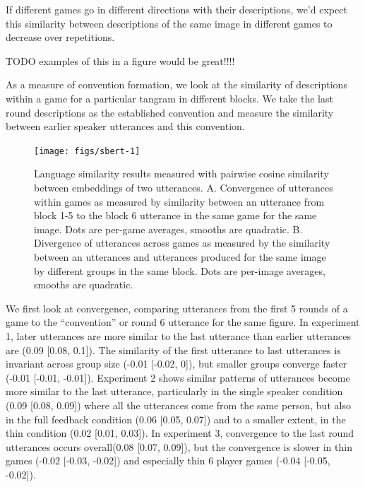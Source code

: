 \documentclass[
  english,
  a4paper,
]{article}
\begin{document}
If different games go in different directions with their descriptions, we'd expect this similarity between descriptions of the same image in different games to decrease over repetitions.

TODO examples of this in a figure would be great!!!!

As a measure of convention formation, we look at the similarity of descriptions within a game for a particular tangram in different blocks. We take the last round descriptions as the established convention and measure the similarity between earlier speaker utterances and this convention.

\begin{figure}[t!]

{\centering \texttt{[image: figs/sbert-1]} 

}

\caption{Language similarity results measured with pairwise cosine similarity between embeddings of two utterances. A. Convergence of utterances within games as measured by similarity between an utterance from block 1-5 to the block 6 utterance in the same game for the same image. Dots are per-game averages, smooths are quadratic. B. Divergence of utterances across games as measured by the similarity between an utterances and utterances produced for the same image by different groups in the same block. Dots are per-image averages, smooths are quadratic.}\label{fig:sbert}
\end{figure}

We first look at convergence, comparing utterances from the first 5 rounds of a game to the ``convention'' or round 6 utterance for the same figure. In experiment 1, later utterances are more similar to the last utterance than earlier utterances are (0.09 {[}0.08, 0.1{]}). The similarity of the first utterance to last utterances is invariant across group size (-0.01 {[}-0.02, 0{]}), but smaller groups converge faster (-0.01 {[}-0.01, -0.01{]}). Experiment 2 shows similar patterns of utterances become more similar to the last utterance, particularly in the single speaker condition (0.09 {[}0.08, 0.09{]}) where all the utterances come from the same person, but also in the full feedback condition (0.06 {[}0.05, 0.07{]}) and to a smaller extent, in the thin condition (0.02 {[}0.01, 0.03{]}). In experiment 3, convergence to the last round utterances occurs overall(0.08 {[}0.07, 0.09{]}), but the convergence is slower in thin games (-0.02 {[}-0.03, -0.02{]}) and especially thin 6 player games (-0.04 {[}-0.05, -0.02{]}).
\end{document}
